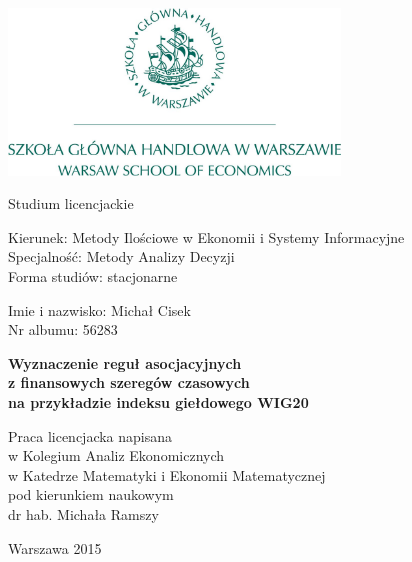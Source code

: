 \documentclass[polish, twoside, 12pt, a4paper]{article}
\theoremstyle{definition}
\theoremstyle{plain}
\theoremstyle{remark}
\begin{document}
\begin{titlepage}
\centering

\includegraphics[width=0.66\textwidth]{logo.JPG}

\vspace*{0.5cm}
Studium licencjackie\\
\begin{flushleft}
Kierunek: Metody Ilościowe w Ekonomii i Systemy Informacyjne\\
Specjalność: Metody Analizy Decyzji\\
Forma studiów: stacjonarne
\end{flushleft}

\vspace*{.5cm}
\rule{0cm}{1cm}\hfill
\begin{minipage}{9cm}
Imie i nazwisko: Michał Cisek\\
Nr albumu: 56283
\end{minipage}

\vspace*{1cm}
\begin{minipage}{12cm}
\centering
\Large
\textbf{Wyznaczenie reguł asocjacyjnych \\ z finansowych szeregów czasowych \\ na przykładzie indeksu giełdowego WIG20}
\end{minipage}

\vspace*{2cm}
\rule{0cm}{1cm}\hfill
\begin{minipage}{9cm}
Praca licencjacka napisana\\
w Kolegium Analiz Ekonomicznych\\
w Katedrze Matematyki i Ekonomii Matematycznej\\
pod kierunkiem naukowym\\
dr hab. Michała Ramszy
\end{minipage}

\vfill
Warszawa 2015
\end{titlepage}
\end{document}
